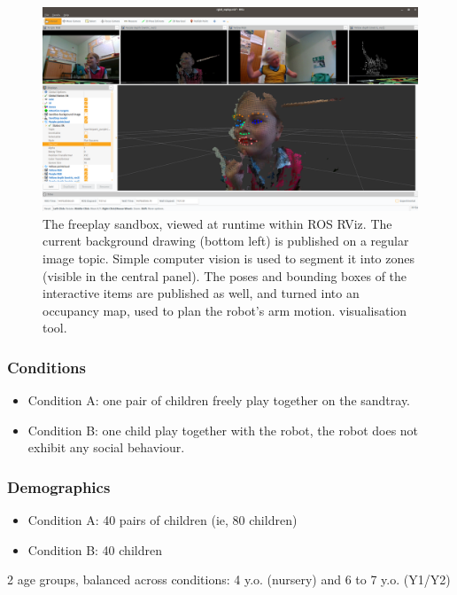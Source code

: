 \documentclass{article}
\begin{document}
\begin{figure}
    \centering
    \includegraphics[width=0.9\linewidth]{3d-point-cloud-facial-features}
    \caption{The freeplay sandbox, viewed at runtime within ROS RViz. The
    current background drawing (bottom left) is published on a regular image
    topic. Simple computer vision is used to segment it into zones (visible in
    the central panel). The poses and bounding boxes of the interactive items
    are published as well, and turned into an occupancy map, used to plan the
    robot's arm motion.
    visualisation tool.}
    \label{fig|rviz}
\end{figure}

\subsubsection{Conditions}\label{conditions}

\begin{itemize}
\item
  Condition A: one pair of children freely play together on the
  sandtray.
\item
  Condition B: one child play together with the robot, the robot does
  not exhibit any social behaviour.
\end{itemize}

\subsubsection{Demographics}\label{demographics}

\begin{itemize}
\item
  Condition A: 40 pairs of children (ie, 80 children)
\item
  Condition B: 40 children
\end{itemize}

2 age groups, balanced across conditions: 4 y.o. (nursery) and 6 to 7
y.o. (Y1/Y2)
\end{document}
